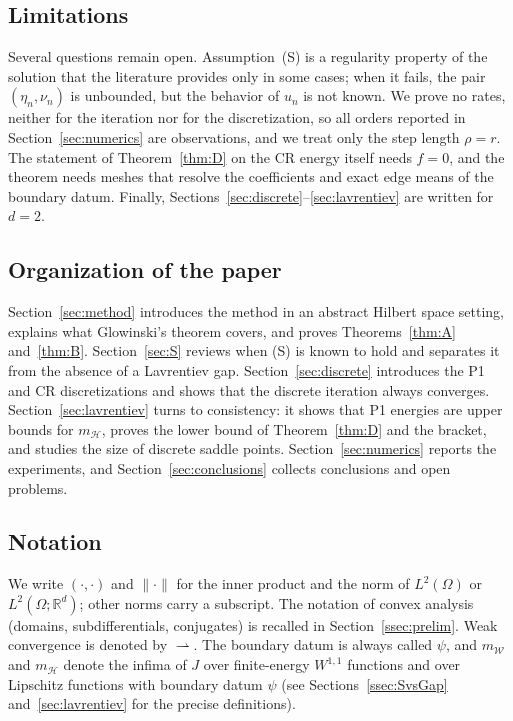 \documentclass[11pt]{amsart}
\theoremstyle{definition}
\theoremstyle{remark}
\numberwithin{equation}{section}
\newcommand{\R}{\mathbb{R}}
\newcommand{\norm}[1]{\lVert #1\rVert}
\newcommand{\mW}{m_{\mathcal W}}
\newcommand{\mH}{m_{\mathcal H}}
\newcommand{\weak}{\rightharpoonup}
\begin{document}
\subsection*{Limitations}
Several questions remain open. Assumption~(S) is a regularity property of the solution that the literature provides only in some cases; when it fails, the pair $(\eta_n,\nu_n)$ is unbounded, but the behavior of $u_n$ is not known. We prove no rates, neither for the iteration nor for the discretization, so all orders reported in Section~\ref{sec:numerics} are observations, and we treat only the step length $\rho=r$. The statement of Theorem~\ref{thm:D} on the CR energy itself needs $f=0$, and the theorem needs meshes that resolve the coefficients and exact edge means of the boundary datum. Finally, Sections~\ref{sec:discrete}--\ref{sec:lavrentiev} are written for $d=2$.

\subsection*{Organization of the paper}
Section~\ref{sec:method} introduces the method in an abstract Hilbert space setting, explains what Glowinski's theorem covers, and proves Theorems~\ref{thm:A} and~\ref{thm:B}. Section~\ref{sec:S} reviews when (S) is known to hold and separates it from the absence of a Lavrentiev gap. Section~\ref{sec:discrete} introduces the P1 and CR discretizations and shows that the discrete iteration always converges. Section~\ref{sec:lavrentiev} turns to consistency: it shows that P1 energies are upper bounds for $\mH$, proves the lower bound of Theorem~\ref{thm:D} and the bracket, and studies the size of discrete saddle points. Section~\ref{sec:numerics} reports the experiments, and Section~\ref{sec:conclusions} collects conclusions and open problems.

\subsection*{Notation}
We write $(\cdot,\cdot)$ and $\norm\cdot$ for the inner product and the norm of $L^2(\Omega)$ or $L^2(\Omega;\R^d)$; other norms carry a subscript. The notation of convex analysis (domains, subdifferentials, conjugates) is recalled in Section~\ref{ssec:prelim}. Weak convergence is denoted by $\weak$. The boundary datum is always called $\psi$, and $\mW$ and $\mH$ denote the infima of $J$ over finite-energy $W^{1,1}$ functions and over Lipschitz functions with boundary datum $\psi$ (see Sections~\ref{ssec:SvsGap} and~\ref{sec:lavrentiev} for the precise definitions).
\end{document}
